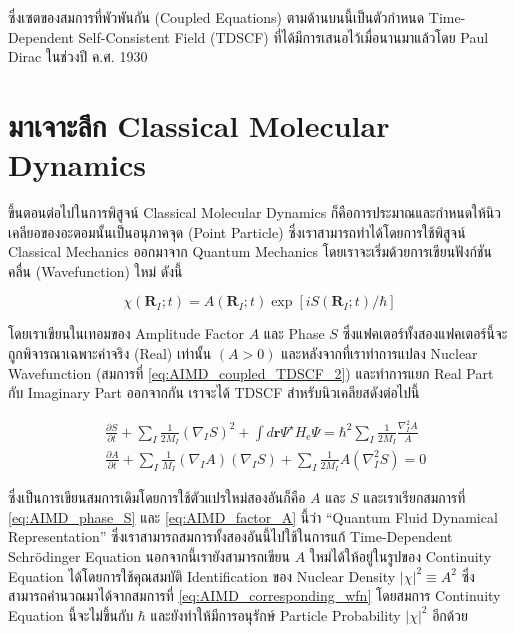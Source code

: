 \noindent ซึ่งเซตของสมการที่พัวพันกัน (Coupled Equations) ตามด้านบนนี้เป็นตัวกำหนด Time-Dependent Self-Consistent Field
(TDSCF) ที่ได้มีการเสนอไว้เมื่อนานมาแล้วโดย Paul Dirac ในช่วงปี ค.ศ. 1930

\section{มาเจาะลึก Classical Molecular Dynamics}

ขึ้นตอนต่อไปในการพิสูจน์ Classical Molecular Dynamics ก็คือการประมาณและกำหนดให้นิวเคลียอของอะตอมนั้นเป็นอนุภาคจุด (Point
Particle) ซึ่งเราสามารถทำได้โดยการใช้พิสูจน์ Classical Mechanics ออกมาจาก Quantum Mechanics โดยเราจะเริ่มด้วยการเขียนฟังก์ชันคลื่น
(Wavefunction) ใหม่ ดังนี้

\begin{equation}
  \label{eq:AIMD_corresponding_wfn}
  \chi\left(\mathbf{R}_I ; t\right)
  =
  A\left(\mathbf{R}_I ; t\right) \exp \left[i S\left(\mathbf{R}_I ; t\right) / \hbar\right]
\end{equation}

\noindent โดยเราเขียนในเทอมของ Amplitude Factor $A$ และ Phase $S$ ซึ่งแฟคเตอร์ทั้งสองแฟคเตอร์นี้จะถูกพิจารณาเฉพาะค่าจริง (Real)
เท่านั้น $(A>0)$ และหลังจากที่เราทำการแปลง Nuclear Wavefunction (สมการที่ \eqref{eq:AIMD_coupled_TDSCF_2}) และทำการแยก
Real Part กับ Imaginary Part ออกจากกัน เราจะได้ TDSCF สำหรับนิวเคลียสดังต่อไปนี้

\begin{align}
  \label{eq:AIMD_phase_S}
   & \frac{\partial S}{\partial t}
  + \sum_I \frac{1}{2 M_I}\left(\nabla_I S\right)^2
  + \int d \mathbf{r} \Psi^{\star} H_{\mathrm{e}} \Psi
  =
  \hbar^2 \sum_I \frac{1}{2 M_I} \frac{\nabla_I^2 A}{A} \\
  \label{eq:AIMD_factor_A}
   & \frac{\partial A}{\partial t}
  + \sum_I \frac{1}{M_I}\left(\nabla_I A\right)\left(\nabla_I S\right)
  + \sum_I \frac{1}{2 M_I} A\left(\nabla_I^2 S\right)
  =
  0
\end{align}

\noindent ซึ่งเป็นการเขียนสมการเดิมโดยการใช้ตัวแปรใหม่สองอันก็คือ $A$ และ $S$ และเราเรียกสมการที่ \eqref{eq:AIMD_phase_S} และ
\eqref{eq:AIMD_factor_A} นี้ว่า \enquote{Quantum Fluid Dynamical Representation} ซึ่งเราสามารถสมการทั้งสองอันนี้ไปใช้ในการแก้
Time-Dependent Schr\"{o}dinger Equation นอกจากนี้เรายังสามารถเขียน $A$ ใหม่ได้ให้อยู่ในรูปของ Continuity Equation
ได้โดยการใช้คุณสมบัติ Identification ของ Nuclear Density $|\chi|^2 \equiv A^2$ ซึ่งสามารถคำนวณมาได้จากสมการที่
\eqref{eq:AIMD_corresponding_wfn} โดยสมการ Continuity Equation นี้จะไม่ขึ้นกับ $\hbar$ และยังทำให้มีการอนุรักษ์ Particle
Probability $|\chi|^2$ อีกด้วย

